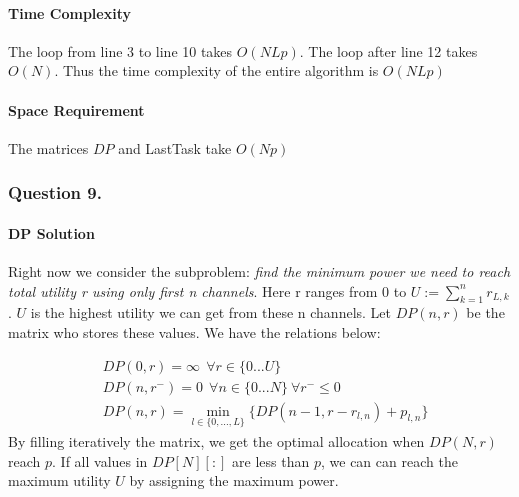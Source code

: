\documentclass[11pt, oneside]{report}
\begin{document}
\paragraph{Time Complexity} The loop from line 3 to line 10 takes $O(NLp)$. The loop after line 12 takes $O(N)$. Thus the time complexity of the entire algorithm is $O(NLp)$
\paragraph{Space Requirement} The matrices $DP$ and LastTask take $O(Np)$

\subsubsection{Question 9. }
\paragraph{DP Solution} Right now we consider the subproblem: \textit{find the minimum power we need to reach total utility r using only first n channels}. Here r ranges from $0$ to $U := \sum_{k = 1}^{n} r_{L,k}$. $U$ is the highest utility we can get from these n channels. Let $DP(n,r)$ be the matrix who stores these values. We have the relations below:

\begin{align*}
&DP(0,r) = \infty \ \  \forall r\in \{0...U\} \\
&DP(n,r^{-}) = 0\ \ \forall n\in \{0...N\}\ \forall r^{-} \le 0 \\
&DP(n,r) =  \min_{l \in \{0,...,L\}} \{ DP(n-1, r-r_{l,n}) + p_{l,n} \}
\end{align*}
By filling iteratively the matrix, we get the optimal allocation when $DP(N,r)$ reach $p$. If all values in $DP[N][:]$ are less than $p$, we can can reach the maximum utility $U$ by assigning the maximum power.\\
\end{document}
